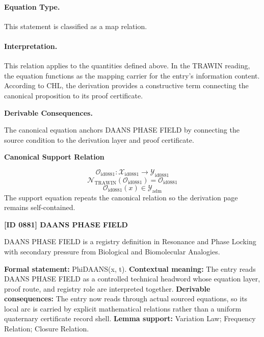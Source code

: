 \paragraph{Equation Type.}
This statement is classified as a map relation.

\paragraph{Interpretation.}
This relation applies to the quantities defined above. In the TRAWIN reading, the equation functions as the mapping carrier for the entry’s information content. According to CHL, the derivation provides a constructive term connecting the canonical proposition to its proof certificate.

\par\vspace{0.35em}
\noindent\textbf{Derivable Consequences.}\quad
\begingroup
\footnotesize
\raggedright
The canonical equation anchors DAANS PHASE FIELD by connecting the source condition to the derivation layer and proof certificate.
\par\endgroup

\noindent\textbf{Canonical Support Relation}\par
\[
\mathcal{O}_{\mathrm{id0881}}:\mathcal{X}_{\mathrm{id0881}}\longrightarrow\mathcal{Y}_{\mathrm{id0881}}
\]
\[
\mathcal{N}_{\mathrm{TRAWIN}}(\mathcal{O}_{\mathrm{id0881}})=\mathcal{O}_{\mathrm{id0881}}
\]
\[
\mathcal{O}_{\mathrm{id0881}}(x)\in\mathcal{Y}_{\mathrm{adm}}
\]
\noindent The support equation repeats the canonical relation so the derivation page remains self-contained.\par

\clearpage
\noindent\textbf{[ID 0881] DAANS PHASE FIELD}\par
\vspace{0.35em}
\begingroup\small
{}
DAANS PHASE FIELD is a registry definition in Resonance and Phase Locking with secondary pressure from Biological and Biomolecular Analogies.

\begingroup\footnotesize\setlength{\emergencystretch}{3em}\sloppy
\textbf{Formal statement:} PhiDAANS(x, t). \textbf{Contextual meaning:} The entry reads DAANS PHASE FIELD as a controlled technical headword whose equation layer, proof route, and registry role are interpreted together. \textbf{Derivable consequences:} The entry now reads through actual sourced equations, so its local arc is carried by explicit mathematical relations rather than a uniform quaternary certificate record shell. \textbf{Lemma support:} Variation Law; Frequency Relation; Closure Relation.\par
\endgroup

